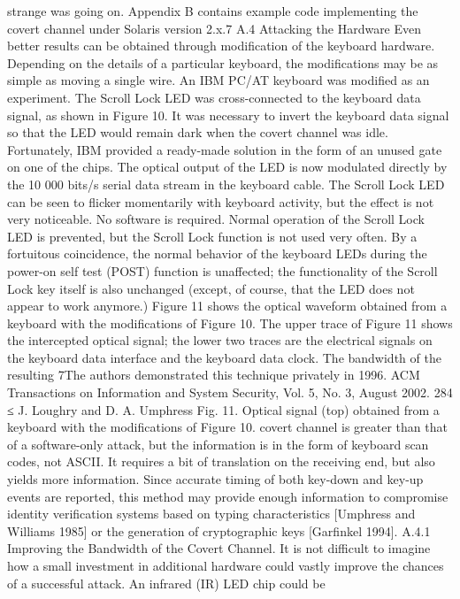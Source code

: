 strange was going on. 
Appendix B contains example code implementing the covert channel under 
Solaris version 2.x.7 
A.4 Attacking the Hardware 
Even better results can be obtained through modification of the keyboard hardware. 
Depending on the details of a particular keyboard, the modifications may 
be as simple as moving a single wire. An IBM PC/AT keyboard was modified as 
an experiment. The Scroll Lock LED was cross-connected to the keyboard data 
signal, as shown in Figure 10. It was necessary to invert the keyboard data 
signal so that the LED would remain dark when the covert channel was idle. 
Fortunately, IBM provided a ready-made solution in the form of an unused gate 
on one of the chips. The optical output of the LED is now modulated directly 
by the 10 000 bits/s serial data stream in the keyboard cable. The Scroll Lock 
LED can be seen to flicker momentarily with keyboard activity, but the effect 
is not very noticeable. No software is required. 
Normal operation of the Scroll Lock LED is prevented, but the Scroll Lock 
function is not used very often. By a fortuitous coincidence, the normal behavior 
of the keyboard LEDs during the power-on self test (POST) function is unaffected; 
the functionality of the Scroll Lock key itself is also unchanged (except, 
of course, that the LED does not appear to work anymore.) 
Figure 11 shows the optical waveform obtained from a keyboard with the 
modifications of Figure 10. The upper trace of Figure 11 shows the intercepted 
optical signal; the lower two traces are the electrical signals on the keyboard 
data interface and the keyboard data clock. The bandwidth of the resulting 
7The authors demonstrated this technique privately in 1996. 
ACM Transactions on Information and System Security, Vol. 5, No. 3, August 2002.
284 ≤ J. Loughry and D. A. Umphress 
Fig. 11. Optical signal (top) obtained from a keyboard with the modifications of Figure 10. 
covert channel is greater than that of a software-only attack, but the information 
is in the form of keyboard scan codes, not ASCII. It requires a bit of 
translation on the receiving end, but also yields more information. Since accurate 
timing of both key-down and key-up events are reported, this method may 
provide enough information to compromise identity verification systems based 
on typing characteristics [Umphress and Williams 1985] or the generation of 
cryptographic keys [Garfinkel 1994]. 
A.4.1 Improving the Bandwidth of the Covert Channel. It is not difficult 
to imagine how a small investment in additional hardware could vastly improve 
the chances of a successful attack. An infrared (IR) LED chip could be 
